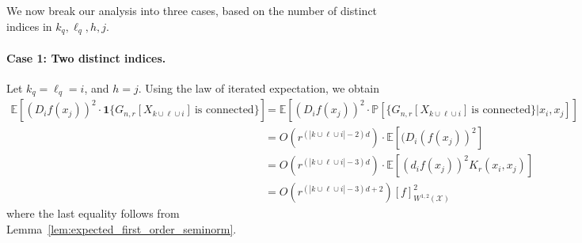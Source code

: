\documentclass{article}
\newcommand{\abs}[1]{\left \lvert #1 \right \rvert}
\newcommand{\1}{\mathbf{1}}
\newcommand{\Xset}{\mathcal{X}}
\newcommand{\Pbb}{\mathbb{P}}
\newcommand{\Ebb}{\mathbb{E}}
\theoremstyle{alden}
\theoremstyle{aldenthm}
\theoremstyle{definition}
\theoremstyle{remark}
\begin{document}
We now break our analysis into three cases, based on the number of distinct indices in $k_q,\ell_q,h,j$. 

\paragraph{Case 1: Two distinct indices.}
Let $k_q = \ell_q = i$, and $h = j$. Using the law of iterated expectation, we obtain
\begin{align*}
\Ebb \left[\left(D_{i}f(x_j)\right)^2 \cdot \1\{G_{n,r}[X_{k \cup \ell \cup i}] ~\textrm{is connected} \}\right] &= \Ebb \left[\left(D_{i}f(x_j)\right)^2 \cdot \Pbb\left[\{G_{n,r}[X_{k \cup \ell \cup i}] ~\textrm{is connected} \} |x_i,x_j\right]\right] \\
& = O(r^{(\abs{k \cup \ell \cup i} - 2)d}) \cdot \Ebb\left[(D_i(f(x_j))^2\right] \\
& = O(r^{(\abs{k \cup \ell \cup i} - 3)d}) \cdot \Ebb\left[(d_if(x_j))^2K_r(x_i,x_j)\right] \\
& = O(r^{(\abs{k \cup \ell \cup i} - 3)d + 2}) [f]_{W^{1,2}(\Xset)}^2
\end{align*}
where the last equality follows from Lemma~\ref{lem:expected_first_order_seminorm}.
\end{document}
